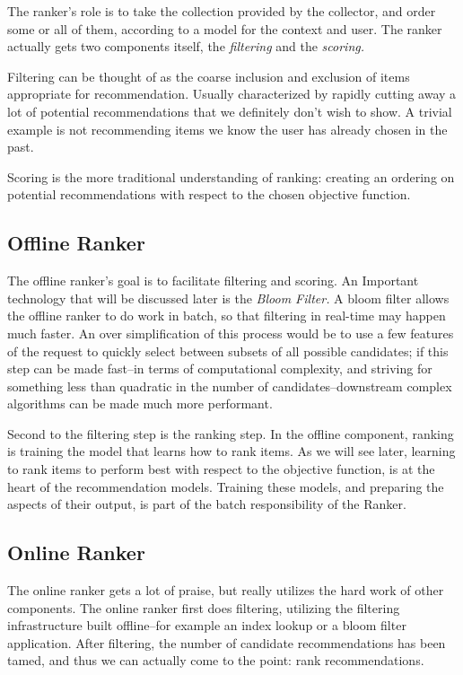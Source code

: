 The ranker's role is to take the collection provided by the collector, and order some or all of them, according to a model for the context and user. The ranker actually gets two components itself, the \emph{filtering} and the \emph{scoring.}

Filtering can be thought of as the coarse inclusion and exclusion of items appropriate for recommendation. Usually characterized by rapidly cutting away a lot of potential recommendations that we definitely don't wish to show. A trivial example is not recommending items we know the user has already chosen in the past.

Scoring is the more traditional understanding of ranking: creating an ordering on potential recommendations with respect to the chosen objective function.

\subsection{Offline Ranker}

The offline ranker's goal is to facilitate filtering and scoring. An Important technology that will be discussed later is the \emph{Bloom Filter.} A bloom filter allows the offline ranker to do work in batch, so that filtering in real-time may happen much faster. An over simplification of this process would be to use a few features of the request to quickly select between subsets of all possible candidates; if this step can be made fast–in terms of computational complexity, and striving for something less than quadratic in the number of candidates–downstream complex algorithms can be made much more performant.

Second to the filtering step is the ranking step. In the offline component, ranking is training the model that learns how to rank items. As we will see later, learning to rank items to perform best with respect to the objective function, is at the heart of the recommendation models. Training these models, and preparing the aspects of their output, is part of the batch responsibility of the Ranker.

\subsection{Online Ranker}

The online ranker gets a lot of praise, but really utilizes the hard work of other components. The online ranker first does filtering, utilizing the filtering infrastructure built offline–for example an index lookup or a bloom filter application. After filtering, the number of candidate recommendations has been tamed, and thus we can actually come to the point: rank recommendations.


